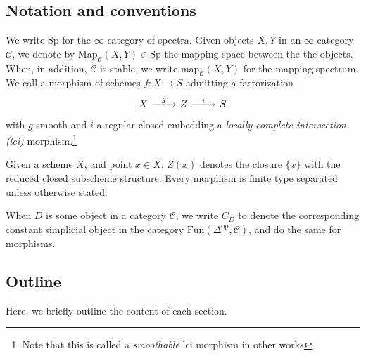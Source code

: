 \documentclass[11pt, twoside]{article}
\numberwithin{equation}{section}
\theoremstyle{definition}
\newcommand{\map}{\mathrm{map}}
\newcommand{\Sp}{\mathrm{Sp}}
\newcommand{\fun}{\mathrm{Fun}}
\newcommand{\Map}{\mathrm{Map}}
\newcommand{\op}{\mathrm{op}}
\begin{document}
\subsection{Notation and conventions}
We write \(\Sp\) for the \(\infty\)-category of spectra. Given objects \(X, Y\) in an \(\infty\)-category \(\mathcal{C}\), we denote by \(\Map_\mathcal{C}(X, Y) \in \Sp\) the mapping space between the the objects. When, in addition, \(\mathcal{C}\) is stable, we write \(\map_\mathcal{C}(X, Y)\) for the mapping spectrum. We call a morphism of schemes \(f \colon X \to S\) admitting a factorization 
\[\begin{tikzcd} X \ar[r, "g"] & Z \ar[r, "i"] & S \end{tikzcd}\]
with \(g\) smooth and \(i\) a regular closed embedding a \emph{locally complete intersection (lci)} morphism.\footnote{Note that this is called a \emph{smoothable} lci morphism in other works}

Given a scheme \(X\), and point \(x \in X\), \(Z(x)\) denotes the closure \(\overline{\{x\}}\) with the reduced closed subscheme structure. Every morphism is finite type separated unless otherwise stated.

When \(D\) is some object in a category \(\mathscr{C}\), we write \(C_D\) to denote the corresponding constant simplicial object in the category \(\fun(\Delta^\op, \mathscr{C})\), and do the same for morphisms.

\subsection{Outline}
Here, we briefly outline the content of each section.
\end{document}

